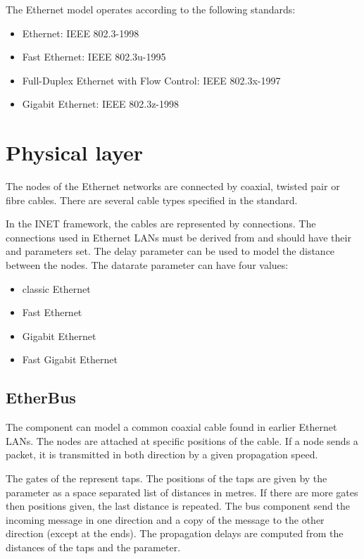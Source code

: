 The Ethernet model operates according to the following standards:

\begin{itemize}
  \item Ethernet: IEEE 802.3-1998
  \item Fast Ethernet: IEEE 802.3u-1995
  \item Full-Duplex Ethernet with Flow Control: IEEE 802.3x-1997
  \item Gigabit Ethernet: IEEE 802.3z-1998
\end{itemize}

\section{Physical layer}

The nodes of the Ethernet networks are connected by coaxial,
twisted pair or fibre cables. There are several cable types specified
in the standard.

In the INET framework, the cables are represented by connections.
The connections used in Ethernet LANs must be derived from
 and should have their  and
 parameters set.
The delay parameter can be used to model the distance between the
nodes. The datarate parameter can have four values:

\begin{itemize}
  \item {} classic Ethernet
  \item {} Fast Ethernet
  \item {} Gigabit Ethernet
  \item {} Fast Gigabit Ethernet
\end{itemize}


\subsection{EtherBus}

The  component can model a common coaxial cable
found in earlier Ethernet LANs. The nodes are attached at specific
positions of the cable. If a node sends a packet, it is transmitted
in both direction by a given propagation speed.

The gates of the  represent taps. The positions
of the taps are given by the  parameter as a
space separated list of distances in metres. If there are more
gates then positions given, the last distance is repeated.
The bus component send the incoming message in one direction and
a copy of the message to the other direction (except at the ends).
The propagation delays are computed from the distances of the taps
and the  parameter.

